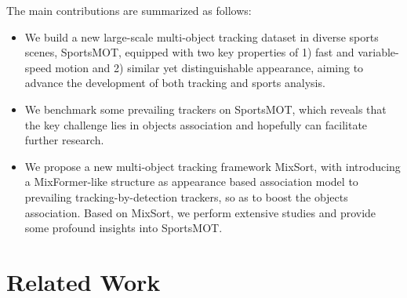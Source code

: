 \documentclass[10pt,twocolumn,letterpaper]{article}
\begin{document}
The main contributions are summarized as follows:
\begin{itemize}
\vspace{-2.5mm}
\item We build a new large-scale multi-object tracking dataset in diverse sports scenes, SportsMOT, equipped with two key properties of 1) fast and variable-speed motion and 2) similar yet distinguishable appearance, aiming to advance the development of both tracking and sports analysis.
\vspace{-2.7mm}
\item We benchmark some prevailing trackers on SportsMOT, which reveals that the key challenge lies in objects association and hopefully can facilitate further research.
\vspace{-2.7mm}
\item We propose a new multi-object tracking framework MixSort, with introducing a MixFormer-like structure as appearance based association model to prevailing tracking-by-detection trackers, so as to boost the objects association.
Based on MixSort, we perform extensive studies and provide some profound insights into SportsMOT.
\end{itemize}

\section{Related Work}
\end{document}
